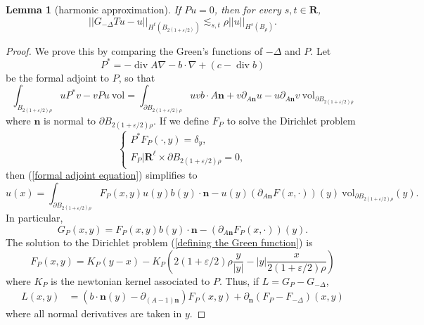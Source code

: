 \documentclass[reqno,12pt,letterpaper]{amsart}
\newcommand{\RR}{\mathbf{R}}
\DeclareMathOperator{\Div}{div}
\newcommand{\normal}{\mathbf n}
\newcommand{\vol}{\mathrm{vol}}
\newtheorem{lemma}[theorem]{Lemma}
\theoremstyle{definition}
\numberwithin{equation}{section}
\begin{document}
\begin{lemma}[harmonic approximation]\label{approx harmonic}
If $Pu = 0$, then for every $s, t \in \RR$,
$$||G_{-\Delta}Tu - u||_{H^t(B_{2(1 + \varepsilon/2)})} \lesssim_{s, t} \rho ||u||_{H^s(B_\rho)}.$$
\end{lemma}
\begin{proof}
We prove this by comparing the Green's functions of $-\Delta$ and $P$. Let
$$P^* = -\Div A \nabla - b \cdot \nabla + (c - \Div b)$$
be the formal adjoint to $P$, so that
\begin{equation}\label{formal adjoint equation}
\int_{B_{2(1 + \varepsilon/2)\rho}} uP^*v - vPu ~\vol = \int_{\partial B_{2(1 + \varepsilon/2)\rho}} uv b \cdot A\normal + v\partial_{A\normal} u - u\partial_{A\normal} v ~\vol_{\partial B_{2(1 + \varepsilon/2)\rho}}
\end{equation}
where $\normal$ is normal to $\partial B_{2(1 + \varepsilon/2)\rho}$.
If we define $F_P$ to solve the Dirichlet problem
\begin{equation}\label{defining the Green function}
\begin{cases}P^* F_P(\cdot, y) = \delta_y,\\
F_P|\RR^\ell \times \partial B_{2(1 + \varepsilon/2)\rho} = 0,
\end{cases}
\end{equation}
then (\ref{formal adjoint equation}) simplifies to
$$u(x) = \int_{\partial B_{2(1 + \varepsilon/2)\rho}} F_P(x, y)u(y) b(y) \cdot \normal - u(y) (\partial_{A \normal} F(x, \cdot))(y) ~\vol_{\partial B_{2(1 + \varepsilon/2)\rho}}(y).$$
In particular,
$$G_P(x, y) = F_P(x, y)b(y) \cdot \normal - (\partial_{A \normal} F_P(x, \cdot))(y).$$
The solution to the Dirichlet problem (\ref{defining the Green function}) is
$$F_P(x, y) = K_P(y - x) - K_P\left(2(1 + \varepsilon/2)\rho \frac{y}{|y|} - |y| \frac{x}{2(1 + \varepsilon/2)\rho}\right)$$
where $K_P$ is the newtonian kernel associated to $P$.
Thus, if $L = G_P - G_{-\Delta}$,
\begin{align*}
L(x, y) &= (b \cdot \normal(y) - \partial_{(A - 1)\normal})F_P(x, y) + \partial_\normal (F_P - F_{-\Delta})(x, y)
\end{align*}
where all normal derivatives are taken in $y$.


\end{proof}
\end{document}
